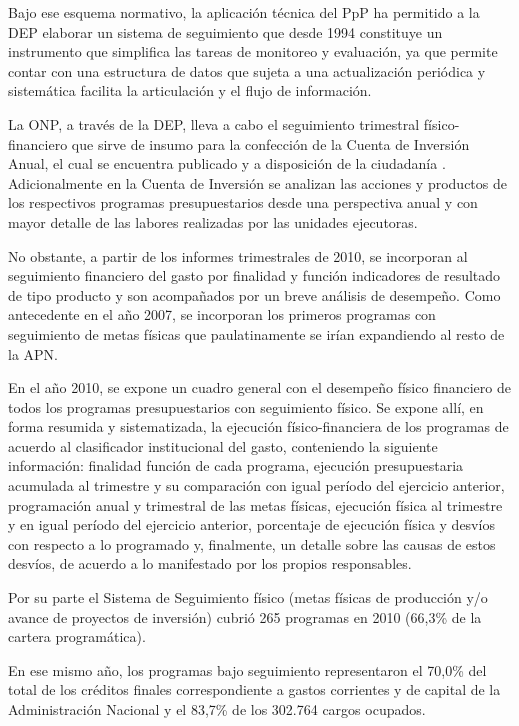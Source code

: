 Bajo ese esquema normativo, la aplicación técnica del PpP ha permitido a la DEP elaborar un sistema de seguimiento que desde 1994 constituye un instrumento que simplifica las tareas de monitoreo y evaluación, ya que permite contar con una estructura de datos que sujeta a una actualización periódica y sistemática facilita la articulación y el flujo de información.

La ONP, a través de la DEP, lleva a cabo el seguimiento trimestral físico-financiero que sirve de insumo para la confección de la Cuenta de Inversión Anual, el cual se encuentra publicado y a disposición de la ciudadanía . Adicionalmente en la Cuenta de Inversión se analizan las acciones y productos de los respectivos programas presupuestarios desde una perspectiva anual y con mayor detalle de las labores realizadas por las unidades ejecutoras.

No obstante, a partir de los informes trimestrales de 2010, se incorporan al seguimiento financiero del gasto por finalidad y función indicadores de resultado de tipo producto y son acompañados por un breve análisis de desempeño. Como antecedente en el año 2007, se incorporan los primeros programas con seguimiento de metas físicas que paulatinamente se irían expandiendo al resto de la APN.

En el año 2010, se expone un cuadro general con el desempeño físico financiero de todos los programas presupuestarios con seguimiento físico. Se expone allí, en forma resumida y sistematizada, la ejecución físico-financiera de los programas de acuerdo al clasificador institucional del gasto, conteniendo la siguiente información: finalidad función de cada programa, ejecución presupuestaria acumulada al trimestre y su comparación con igual período del ejercicio anterior, programación anual y trimestral de las metas físicas, ejecución física al trimestre y en igual período del ejercicio anterior, porcentaje de ejecución física y desvíos con respecto a lo programado y, finalmente, un detalle sobre las causas de estos desvíos, de acuerdo a lo manifestado por los propios responsables.

Por su parte el Sistema de Seguimiento físico (metas físicas de producción y/o avance de proyectos de inversión) cubrió 265 programas en 2010 (66,3\% de la cartera programática). 

En ese mismo año, los programas bajo seguimiento representaron el 70,0\% del total de los créditos finales correspondiente a gastos corrientes y de capital de la Administración Nacional y el 83,7\% de los 302.764 cargos ocupados. 

